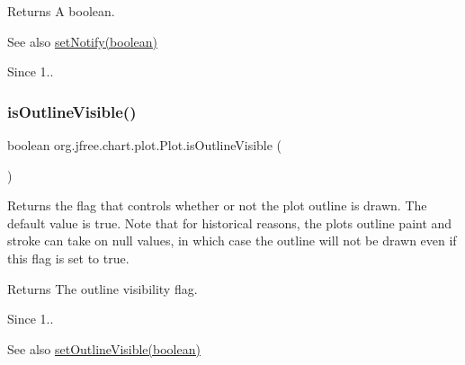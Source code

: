 \begin{DoxyReturn}{Returns}
A boolean.
\end{DoxyReturn}
\begin{DoxySeeAlso}{See also}
\mbox{\hyperlink{classorg_1_1jfree_1_1chart_1_1plot_1_1_plot_a2c5acdb70d34e3449b99e8ad646140db}{set\+Notify(boolean)}}
\end{DoxySeeAlso}
\begin{DoxySince}{Since}
1.. 
\end{DoxySince}
\mbox{\label{classorg_1_1jfree_1_1chart_1_1plot_1_1_plot_a52723c31418d363029e8b59b6cd43711}} 
\subsubsection{\texorpdfstring{is\+Outline\+Visible()}{isOutlineVisible()}}
{\footnotesize\ttfamily boolean org.\+jfree.\+chart.\+plot.\+Plot.\+is\+Outline\+Visible (\begin{DoxyParamCaption}{ }\end{DoxyParamCaption})}

Returns the flag that controls whether or not the plot outline is drawn. The default value is {\ttfamily true}. Note that for historical reasons, the plot\textquotesingle{}s outline paint and stroke can take on {\ttfamily null} values, in which case the outline will not be drawn even if this flag is set to {\ttfamily true}.

\begin{DoxyReturn}{Returns}
The outline visibility flag.
\end{DoxyReturn}
\begin{DoxySince}{Since}
1..
\end{DoxySince}
\begin{DoxySeeAlso}{See also}
\mbox{\hyperlink{classorg_1_1jfree_1_1chart_1_1plot_1_1_plot_a999872809bfd7cffd4731cb1b7439826}{set\+Outline\+Visible(boolean)}} 
\end{DoxySeeAlso}
\mbox{\label{classorg_1_1jfree_1_1chart_1_1plot_1_1_plot_aabc12756f8fc3f63605ca3eb8893fd19}} 
